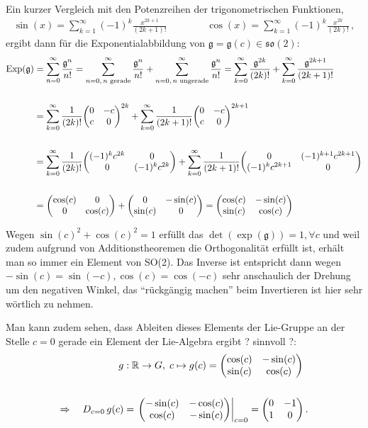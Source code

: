 \documentclass[../H_Analysis_main.tex]{subfiles}
\begin{document}
\begin{bsp}
Ein kurzer Vergleich mit den Potenzreihen der trigonometrischen Funktionen,
\begin{align*}
\sin(x) = \sum_{k = 1}^\infty (-1)^k \frac{x^{2k + 1}}{(2k + 1)!} \qquad \qquad \cos(x) = \sum_{k = 1}^\infty (-1)^k \frac{x^{2k}}{(2k)!} \, ,
\end{align*}
ergibt dann für die Exponentialabbildung von $\mathfrak{g} = \mathfrak{g}(c) \in \mathfrak{so}(2)$:
\begin{align}
\text{Exp}(\mathfrak{g}) &= \sum_{n = 0}^\infty \frac{\mathfrak{g}^n}{n!} = \sum_{n = 0, \, n \text{ gerade}}^\infty \frac{\mathfrak{g}^n}{n!} + \sum_{n = 0, \, n \text{ ungerade}}^\infty \frac{\mathfrak{g}^n}{n!} = \sum_{k = 0}^\infty \frac{\mathfrak{g}^{2k}}{(2k)!} + \sum_{k = 0}^\infty \frac{\mathfrak{g}^{2k + 1}}{(2k + 1)!}
\notag\\
\notag\\
&= \sum_{k = 0}^\infty \frac{1}{(2k)!} \mqty(0 & -c \\ c & 0)^{2k} + \sum_{k = 0}^\infty \frac{1}{(2k + 1)!} \mqty(0 & -c \\ c & 0)^{2k + 1}
\notag\\
\notag\\
&= \sum_{k = 0}^\infty \frac{1}{(2k)!} \mqty( (-1)^k c^{2k} & 0 \\ 0 & (-1)^k c^{2k}) + \sum_{k = 0}^\infty \frac{1}{(2k + 1)!} \mqty(0 & (-1)^{k + 1} c^{2k + 1} \\ (-1)^k c^{2k + 1}  & 0)
\notag\\
\notag\\
&= \mqty(\cos(c) & 0 \\ 0 & \cos(c)) + \mqty(0 & -\sin(c) \\ \sin(c) & 0) = \mqty(\cos(c) & -\sin(c) \\ \sin(c) & \cos(c))
\end{align}

Wegen $\sin(c)^2 + \cos(c)^2 = 1$ erfüllt das $\det(\exp(\mathfrak{g})) = 1, \forall c$ und weil zudem aufgrund von Additionstheoremen die Orthogonalität erfüllt ist, erhält man so immer ein Element von SO(2). Das Inverse ist entspricht dann wegen $-\sin(c) = \sin(-c), \cos(c) = \cos(-c)$ sehr anschaulich der Drehung um den negativen Winkel, das \enquote{rückgängig machen} beim Invertieren ist hier sehr wörtlich zu nehmen.

Man kann zudem sehen, dass Ableiten dieses Elements der Lie-Gruppe an der Stelle $c = 0$ gerade ein Element der Lie-Algebra ergibt ? sinnvoll ?:
\begin{align*}
g&: \mathbb{R} \rightarrow G, \; c \mapsto g(c) = \mqty(\cos(c) & -\sin(c) \\ \sin(c) & \cos(c))
\\\\
\Rightarrow \quad D_{c = 0} \, g(c) &= \eval{\mqty(-\sin(c) & -\cos(c) \\ \cos(c) & -\sin(c))}_{c = 0} = \mqty(0 & -1 \\ 1 & 0) \, .
\end{align*}


\end{bsp}
\end{document}
